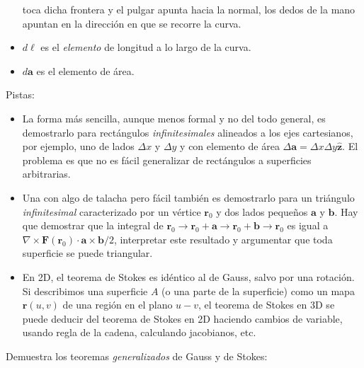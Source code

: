 \documentclass{exam}
\begin{document}
\begin{questions}
\begin{itemize}
    toca dicha frontera y el pulgar apunta hacia la normal, los dedos de
    la mano apuntan en la dirección en que se recorre la curva.
  \item $d\bm \ell$ es el {\em elemento} de longitud a lo largo de la
    curva.
  \item $d\bm a$ es el elemento de área.
  \end{itemize}
  Pistas:
  \begin{itemize}
  \item La forma más sencilla, aunque menos formal y no del todo general, es demostrarlo
    para rectángulos {\em infinitesimales} alineados a los ejes
    cartesianos, por ejemplo, uno de lados $\Delta x$ y $\Delta y$ y
    con elemento de área $\Delta \bm a=\Delta
    x\Delta y\hat{\bm z}$. El problema es que no es fácil generalizar de rectángulos a
    superficies arbitrarias.
  \item Una con algo de talacha pero fácil también es demostrarlo para
    un triángulo {\em infinitesimal} caracterizado por un vértice $\bm
    r_0$ y dos lados pequeños $\bm a$ y $\bm b$. Hay que demostrar que
    la integral de $\bm r_0\to\bm r_0+\bm a\to\bm r_0+\bm b\to\bm r_0$
    es igual a $\nabla\times\bm F(\bm r_0)\cdot\bm a\times\bm b/2$,
    interpretar este resultado y argumentar que toda superficie se
    puede triangular.
  \item En 2D, el teorema de Stokes es idéntico al de
    Gauss, salvo por una rotación. Si describimos una superficie $A$ (o una
    parte de la superficie) como un mapa $\bm r(u,v)$ de una región en el plano
    $u-v$, el teorema de Stokes en 3D se puede deducir del teorema de
    Stokes en 2D haciendo cambios de variable, usando regla de la
    cadena, calculando jacobianos, etc.
  \end{itemize}
  \question Demuestra los teoremas {\em generalizados} de Gauss y de Stokes:
\end{questions}
\end{document}
